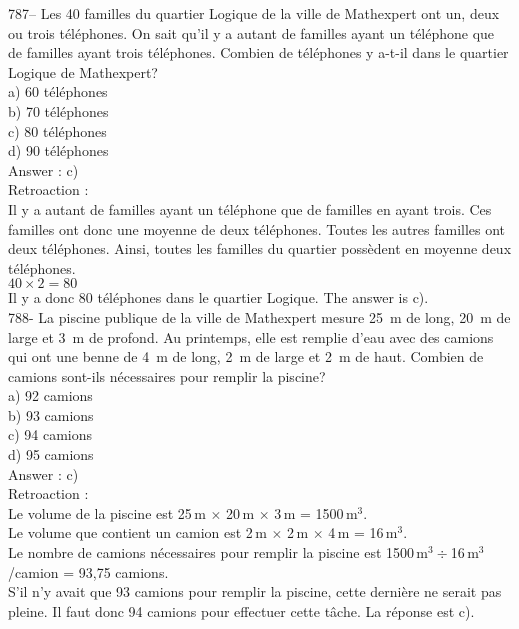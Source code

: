 ﻿\documentclass[letterpaper, 12pt]{article}
\begin{document}
787-- Les 40 familles du quartier Logique de la ville de Mathexpert ont un,
deux ou trois t\'el\'ephones.  On sait qu'il y a autant de familles ayant un
t\'el\'ephone que de familles ayant trois t\'el\'ephones.  Combien de
t\'el\'ephones y a-t-il dans le quartier Logique de Mathexpert?\\
a) 60 t\'el\'ephones\\
b) 70 t\'el\'ephones\\
c) 80 t\'el\'ephones\\
d) 90 t\'el\'ephones\\

Answer : c)\\

Retroaction : \\
Il y a autant de familles ayant un t\'el\'ephone que de familles en ayant
trois.  Ces familles ont donc une moyenne de deux t\'el\'ephones.  Toutes
les autres familles ont deux t\'el\'ephones.  Ainsi, toutes les familles du
quartier poss\`edent en moyenne deux t\'el\'ephones.  \\
$40\times2=80$\\
Il y a donc 80 t\'el\'ephones dans le quartier Logique.  The answer is
c).\\

788- La piscine publique de la ville de Mathexpert mesure 25~m de long, 20~m
de large et 3~m de profond.  Au printemps, elle est remplie d'eau avec des
camions qui ont une benne de 4~m de long, 2~m de large et 2~m de haut.
Combien de camions sont-ils n\'ecessaires pour remplir la piscine?\\
a) 92 camions\\
b) 93 camions\\
c) 94 camions\\
d) 95 camions\\

Answer : c)\\

Retroaction : \\
Le volume de la piscine est 25\,m $\times$ 20\,m $\times$ 3\,m =
1500\,m$^{3}$.\\
Le volume que contient un camion est 2\,m $\times$ 2\,m $\times$ 4\,m =
16\,m$^{3}$.\\
Le nombre de camions n\'ecessaires pour remplir la piscine est
1500\,m$^{3}\div$16\,m$^{3}$/camion = 93,75 camions.\\
S'il n'y avait que 93 camions pour remplir la piscine, cette derni\`ere ne
serait pas pleine. Il faut donc 94 camions pour effectuer cette t\^ache. La
r\'eponse est c).\\
\end{document}
